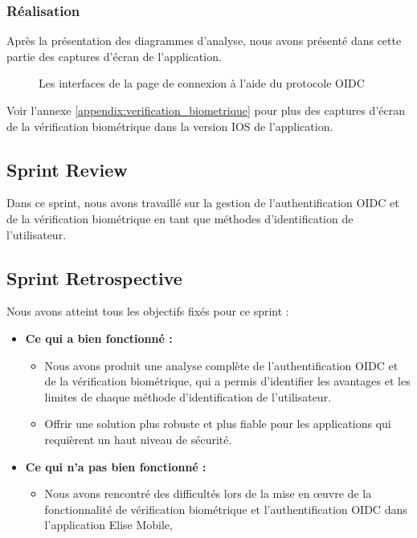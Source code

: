 \subsubsection{Réalisation}

Après la présentation des diagrammes d'analyse, nous avons présenté dans cette partie des captures d'écran de l'application.

\begin{figure}[H]
  \centering
  \caption{Les interfaces de la page de connexion à l'aide du protocole OIDC}
  \label{fig:realisation_OIDC}
\end{figure}
Voir l'annexe \ref{appendix:verification_biometrique} pour plus des captures d'écran de la vérification biométrique dans la version IOS de l'application.

\subsection{Sprint Review}
Dans ce sprint, nous avons travaillé sur la gestion de l'authentification OIDC et de la vérification biométrique en tant que méthodes d'identification de l'utilisateur.
\subsection{Sprint Retrospective}
Nous avons atteint tous les objectifs fixés pour ce sprint :
\begin{itemize}
  \item \textbf{Ce qui a bien fonctionné :}
  \begin{itemize}
    \item Nous avons produit une analyse complète de l'authentification OIDC et de la vérification biométrique, qui a permis d'identifier les avantages et les limites de chaque méthode d'identification de l'utilisateur.
    \item Offrir une solution plus robuste et plus fiable pour les applications qui requièrent un haut niveau de sécurité.
    
  \end{itemize}

    \item \textbf{Ce qui n'a pas bien fonctionné :}
    \begin{itemize}
      \item Nous avons rencontré des difficultés lors de la mise en œuvre de la fonctionnalité de vérification biométrique et l'authentification OIDC dans l'application Elise Mobile,
    \end{itemize}
      
\end{itemize}
